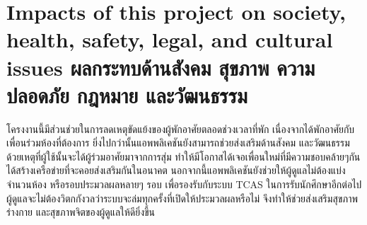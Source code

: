 
\section{\ifenglish%
      Impacts of this project on society, health, safety, legal, and cultural issues
  \else%
      ผลกระทบด้านสังคม สุขภาพ ความปลอดภัย กฎหมาย และวัฒนธรรม
  \fi}

โครงงานนี้มีส่วนช่วยในการลดเหตุขัดแย้งของผู้พักอาศัยตลอดช่วงเวลาที่พัก
เนื่องจากได้พักอาศัยกับเพื่อนร่วมห้องที่ต้องการ ยิ่งไปกว่านั้นแอพพลิเคชันยังสามารถช่วยส่งเสริมด้านสังคม 
และวัฒนธรรม ด้วยเหตุที่ผู้ใช้นั้นจะได้ผู้ร่วมอาศัยมาจากการสุ่ม ทำให้มีโอกาสได้เจอเพื่อนใหม่ที่มีความชอบคล้ายๆกัน 
ได้สร้างเครือข่ายที่จะคอยส่งเสริมกันในอนาคต นอกจากนี้แอพพลิเคชันยังช่วยให้ผู้ดูแลไม่ต้องแบ่งจำนวนห้อง 
หรือรอบประมวลผลหลายๆ รอบ เพื่อรองรับกับระบบ TCAS ในการรับนักศึกษาอีกต่อไป
ผู้ดูแลจะไม่ต้องวิตกกังวลว่าระบบจะล่มทุกครั้งที่เปิดให้ประมวลผลหรือไม่ จึงทำให้ช่วยส่งเสริมสุขภาพร่างกาย 
และสุขภาพจิตของผู้ดูแลให้ดียิ่งขึ้น


